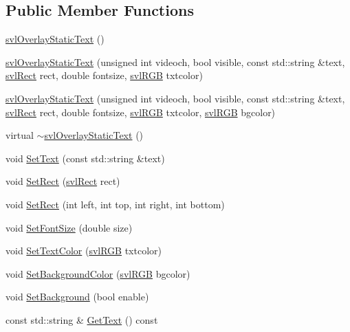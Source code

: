 \subsection*{Public Member Functions}
\begin{DoxyCompactItemize}
\item 
\hyperlink{classsvl_overlay_static_text_add1b84facba4a2e4d8ef8a72adb0d3bd}{svl\-Overlay\-Static\-Text} ()
\item 
\hyperlink{classsvl_overlay_static_text_a1ad30d815d82d5e9d2215ea204d53fae}{svl\-Overlay\-Static\-Text} (unsigned int videoch, bool visible, const std\-::string \&text, \hyperlink{structsvl_rect}{svl\-Rect} rect, double fontsize, \hyperlink{structsvl_r_g_b}{svl\-R\-G\-B} txtcolor)
\item 
\hyperlink{classsvl_overlay_static_text_ae59e96433c724a398cb3a65d761f1852}{svl\-Overlay\-Static\-Text} (unsigned int videoch, bool visible, const std\-::string \&text, \hyperlink{structsvl_rect}{svl\-Rect} rect, double fontsize, \hyperlink{structsvl_r_g_b}{svl\-R\-G\-B} txtcolor, \hyperlink{structsvl_r_g_b}{svl\-R\-G\-B} bgcolor)
\item 
virtual \hyperlink{classsvl_overlay_static_text_a7db0f0c7ff835089e36c2bb5181629a8}{$\sim$svl\-Overlay\-Static\-Text} ()
\item 
void \hyperlink{classsvl_overlay_static_text_ad9a57e18f9156dd090be05f19ec7d1c9}{Set\-Text} (const std\-::string \&text)
\item 
void \hyperlink{classsvl_overlay_static_text_a8ef0f5a31bc6cfd828b70ced9fdd0b53}{Set\-Rect} (\hyperlink{structsvl_rect}{svl\-Rect} rect)
\item 
void \hyperlink{classsvl_overlay_static_text_add60db89ab9ffc98dd552082b9d96cba}{Set\-Rect} (int left, int top, int right, int bottom)
\item 
void \hyperlink{classsvl_overlay_static_text_a9f6b55144f19e566e4eca8a87ef3cca3}{Set\-Font\-Size} (double size)
\item 
void \hyperlink{classsvl_overlay_static_text_a403d1378964e3f0a6fab29fdd5f5b010}{Set\-Text\-Color} (\hyperlink{structsvl_r_g_b}{svl\-R\-G\-B} txtcolor)
\item 
void \hyperlink{classsvl_overlay_static_text_a6e3134b7dbd29c1dd0c6c95bcadbf6e7}{Set\-Background\-Color} (\hyperlink{structsvl_r_g_b}{svl\-R\-G\-B} bgcolor)
\item 
void \hyperlink{classsvl_overlay_static_text_af63f66c4606e25d33776b5eb18a3c3a3}{Set\-Background} (bool enable)
\item 
const std\-::string \& \hyperlink{classsvl_overlay_static_text_aa9ef3b410eacad29cf0fa0b0d2d11080}{Get\-Text} () const 

\end{DoxyCompactItemize}
